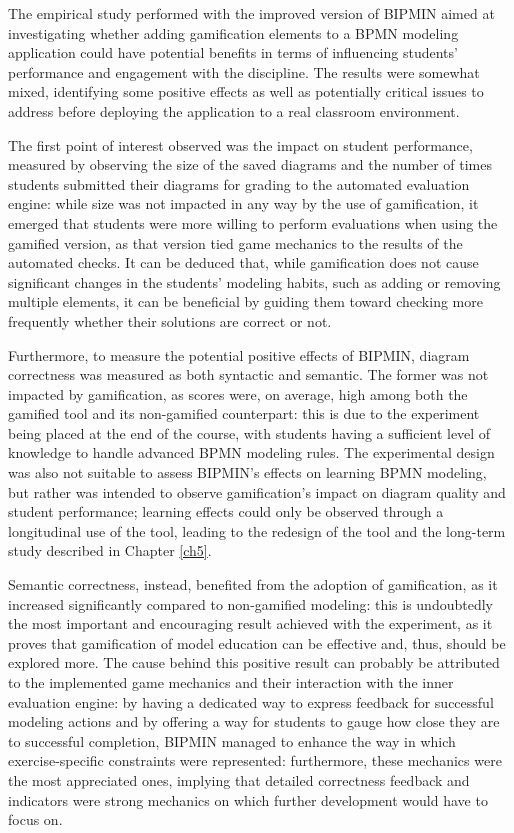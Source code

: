 The empirical study performed with the improved version of BIPMIN aimed at investigating whether adding gamification elements to a BPMN modeling application could have potential benefits in terms of influencing students' performance and engagement with the discipline. The results were somewhat mixed, identifying some positive effects as well as potentially critical issues to address before deploying the application to a real classroom environment.

The first point of interest observed was the impact on student performance, measured by observing the size of the saved diagrams and the number of times students submitted their diagrams for grading to the automated evaluation engine: while size was not impacted in any way by the use of gamification, it emerged that students were more willing to perform evaluations when using the gamified version, as that version tied game mechanics to the results of the automated checks. It can be deduced that, while gamification does not cause significant changes in the students' modeling habits, such as adding or removing multiple elements, it can be beneficial by guiding them toward checking more frequently whether their solutions are correct or not.

Furthermore, to measure the potential positive effects of BIPMIN, diagram correctness was measured as both syntactic and semantic. The former was not impacted by gamification, as scores were, on average, high among both the gamified tool and its non-gamified counterpart: this is due to the experiment being placed at the end of the course, with students having a sufficient level of knowledge to handle advanced BPMN modeling rules. The experimental design was also not suitable to assess BIPMIN's effects on learning BPMN modeling, but rather was intended to observe gamification's impact on diagram quality and student performance; learning effects could only be observed through a longitudinal use of the tool, leading to the redesign of the tool and the long-term study described in Chapter \ref{ch5}.

Semantic correctness, instead, benefited from the adoption of gamification, as it increased significantly compared to non-gamified modeling: this is undoubtedly the most important and encouraging result achieved with the experiment, as it proves that gamification of model education can be effective and, thus, should be explored more. The cause behind this positive result can probably be attributed to the implemented game mechanics and their interaction with the inner evaluation engine: by having a dedicated way to express feedback for successful modeling actions and by offering a way for students to gauge how close they are to successful completion, BIPMIN managed to enhance the way in which exercise-specific constraints were represented: furthermore, these mechanics were the most appreciated ones, implying that detailed correctness feedback and indicators were strong mechanics on which further development would have to focus on.

